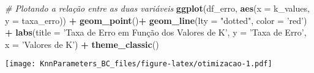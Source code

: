 \documentclass[]{article}
\newenvironment{Shaded}{\begin{snugshade}}{\end{snugshade}}
\newcommand{\KeywordTok}[1]{\textcolor[rgb]{0.13,0.29,0.53}{\textbf{#1}}}
\newcommand{\DataTypeTok}[1]{\textcolor[rgb]{0.13,0.29,0.53}{#1}}
\newcommand{\StringTok}[1]{\textcolor[rgb]{0.31,0.60,0.02}{#1}}
\newcommand{\CommentTok}[1]{\textcolor[rgb]{0.56,0.35,0.01}{\textit{#1}}}
\newcommand{\OperatorTok}[1]{\textcolor[rgb]{0.81,0.36,0.00}{\textbf{#1}}}
\newcommand{\NormalTok}[1]{#1}
\begin{document}
\begin{Shaded}
\begin{Highlighting}[]
\CommentTok{# Plotando a relação entre as duas variáveis}
\KeywordTok{ggplot}\NormalTok{(df_erro, }\KeywordTok{aes}\NormalTok{(}\DataTypeTok{x =}\NormalTok{ k_values, }\DataTypeTok{y =}\NormalTok{ taxa_erro)) }\OperatorTok{+}\StringTok{ }
\StringTok{  }\KeywordTok{geom_point}\NormalTok{()}\OperatorTok{+}\StringTok{ }
\StringTok{  }\KeywordTok{geom_line}\NormalTok{(}\DataTypeTok{lty =} \StringTok{"dotted"}\NormalTok{, }\DataTypeTok{color =} \StringTok{'red'}\NormalTok{) }\OperatorTok{+}
\StringTok{  }\KeywordTok{labs}\NormalTok{(}\DataTypeTok{title =} \StringTok{'Taxa de Erro em Função dos Valores de K'}\NormalTok{,}
       \DataTypeTok{y =} \StringTok{'Taxa de Erro'}\NormalTok{, }\DataTypeTok{x =} \StringTok{'Valores de K'}\NormalTok{) }\OperatorTok{+}
\StringTok{  }\KeywordTok{theme_classic}\NormalTok{()}
\end{Highlighting}
\end{Shaded}

\texttt{[image: KnnParameters\_BC\_files/figure-latex/otimizacao-1.pdf]}
\end{document}
